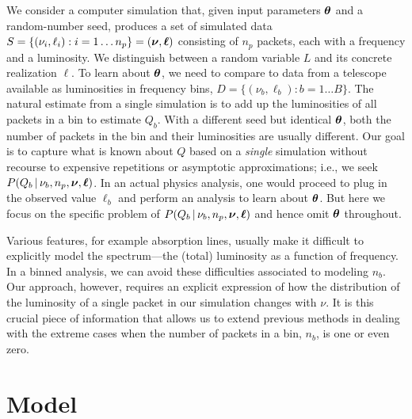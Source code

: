\documentclass[11pt]{article}
\newcommand{\fred}[1]{\todo[color=orange!40,inline]{#1}} %
\newcommand{\cond}{\,|\,}
\newcommand{\npack}{{n_p}}
\newcommand{\Lumtot}{Q}
\begin{document}
We consider a computer simulation that, given input parameters
${\bm{\theta}}$ and a random-number seed, produces a set of simulated data
$ S = \{ (\nu_i, \ell_i): i=1\dots\npack \} = (\bmnu, \bml)$
consisting of $\npack$ packets, each with a frequency and a
luminosity. We distinguish between a random variable $L$ and its
concrete realization $\ell$.  To learn about ${\bm{\theta}}$, we need to
compare to data from a telescope available as luminosities in
frequency bins, $D = \{ ( \nu_b, \ell_b): b=1 \dots B\}$. The natural
estimate from a single simulation is to add up the luminosities of all
packets in a bin to estimate $\Lumtot_b$.  With a different seed but
identical ${\bm{\theta}}$, both the number of packets in the bin and their
luminosities are usually different. Our goal is to capture what is
known about $\Lumtot$ based on a \emph{single} simulation without recourse
to expensive repetitions or asymptotic approximations; i.e., we seek
$P(\Lumtot_b \cond \nu_b, \npack, \bmnu, \bml )$. In an actual physics
analysis, one would proceed to plug in the observed value $\ell_b$ and
perform an analysis to learn about ${\bm{\theta}}$. But here we focus on
the specific problem of $P(\Lumtot_b \cond \nu_b, \npack, \bmnu, \bml )$ and
hence omit ${\bm{\theta}}$ throughout.

Various features, for example absorption lines, usually make it
difficult to explicitly model the spectrum---the (total) luminosity as
a function of frequency. In a binned analysis, we can avoid these
difficulties associated to modeling $n_b$. Our approach, however,
requires an explicit expression of how the distribution of the
luminosity of a single packet in our simulation changes with $\nu$. It
is this crucial piece of information that allows us to extend previous
methods \fred{Refs: Zech, maybe others, too} in dealing with the
extreme cases when the number of packets in a bin, $n_b$, is one or
even zero.

\section{Model} \label{sec:model}
\end{document}
